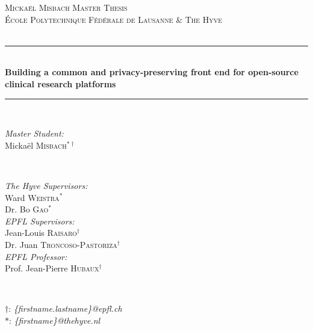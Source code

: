 \begin{titlepage}

\newcommand{\HRule}{\rule{\linewidth}{0.5mm}}
\center
 
\textsc{\LARGE Mickaël Misbach Master Thesis}\\[0.5cm]

\textsc{\Large École Polytechnique Fédérale de Lausanne \& The Hyve}\\[0.5cm] 
\textsc{\large \reportTitle}\\[0.5cm]

\HRule \\[0.4cm]
{ \huge \bfseries Building a common and privacy-preserving front end for open-source clinical research platforms}\\[0.4cm]
\HRule \\[1cm]
 
\begin{minipage}{0.4\textwidth}
\begin{flushleft} \large
\emph{Master Student:}\\
Mickaël \textsc{Misbach}$^{*\dagger}$\\
\end{flushleft}
\end{minipage}
~
\begin{minipage}{0.4\textwidth}
\begin{flushright} \large
\emph{The Hyve Supervisors:} \\
Ward \textsc{Weistra}$^*$\\
Dr. Bo \textsc{Gao}$^*$\\[\baselineskip]
\emph{EPFL Supervisors:} \\
Jean-Louis \textsc{Raisaro}$^\dagger$\\
Dr. Juan \textsc{Troncoso-Pastoriza}$^\dagger$\\[\baselineskip]
\emph{EPFL Professor:} \\
Prof. Jean-Pierre \textsc{Hubaux}$^\dagger$\\
\end{flushright}
\end{minipage}
~ \\[0.5cm]
\begin{minipage}{1\textwidth}
\begin{flushbottom}
\centering\small
$\dagger$: \emph{\{firstname.lastname\}@epfl.ch} \\
$*$: \emph{\{firstname\}@thehyve.nl} \\
\end{flushbottom}
\end{minipage}\\[2cm]



\end{titlepage}
